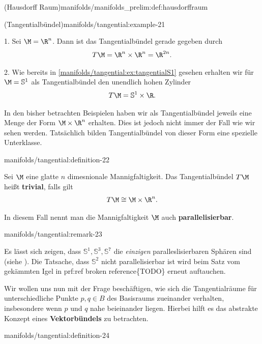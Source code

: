 \documentclass[letterpaper,10pt,english]{jupyterBook}
\begin{document}
\begin{definition}{(Hausdorff Raum)}{manifolds/manifolds_prelim:def:hausdorffraum}
\begin{example}{(Tangentialbündel)}{manifolds/tangential:example-21}
\par
1. Sei \(\M=\R^n\).
Dann ist das Tangentialbündel gerade gegeben durch
\begin{align*}
T\M = \R^n\times\R^n = \R^{2n}.
\end{align*}


\par
2. Wie bereits in \cref{manifolds/tangential:ex:tangentialS1} gesehen erhalten wir für \(\M=\mathbb{S}^1\) als Tangentialbündel den unendlich hohen Zylinder
\begin{align*}
T\M = \mathbb{S}^1\times \R.
\end{align*}\end{example}

\par
In den bisher betrachten Beispielen haben wir als Tangentialbündel jeweils eine Menge der Form \(\M\times \R^n\) erhalten.
Dies ist jedoch nicht immer der Fall wie wir sehen werden.
Tatsächlich bilden Tangentialbündel von dieser Form eine spezielle Unterklasse.
\begin{definition}{}{manifolds/tangential:definition-22}



\par
Sei \(\M\) eine glatte \(n\) dimesnionale Mannigfaltigkeit.
Das Tangentialbündel \(T\M\) heißt \textbf{trivial}, falls gilt
\begin{align*}
T\M\cong \M\times\R^n.
\end{align*}
\par
In diesem Fall nennt man die Mannigfaltigkeit \(\M\) auch \textbf{parallelisierbar}.
\end{definition}
\begin{remark}{}{manifolds/tangential:remark-23}



\par
Es lässt sich zeigen, dass \(\mathbb{S}^1, \mathbb{S}^3,\mathbb{S}^7\) die \emph{einzigen} paralleslisierbaren Sphären sind (siehe \cite{Lee03}).
Die Tatsache, dass \(\mathbb{S}^2\) nicht parallelisierbar ist wird beim Satz vom gekämmten Igel in {prf:ref broken reference}\{TODO\} erneut auftauchen.
\end{remark}

\par
Wir wollen uns nun mit der Frage beschäftigen, wie sich die Tangentialräume für unterschiedliche Punkte \(p,q\in B\) des Basisraums zueinander verhalten, insbesondere wenn \(p\) und \(q\) nahe beieinander liegen.
Hierbei hilft es das abstrakte Konzept eines \textbf{Vektorbündels} zu betrachten.
\begin{definition}{}{manifolds/tangential:definition-24}




\end{definition}
\end{definition}
\end{document}
